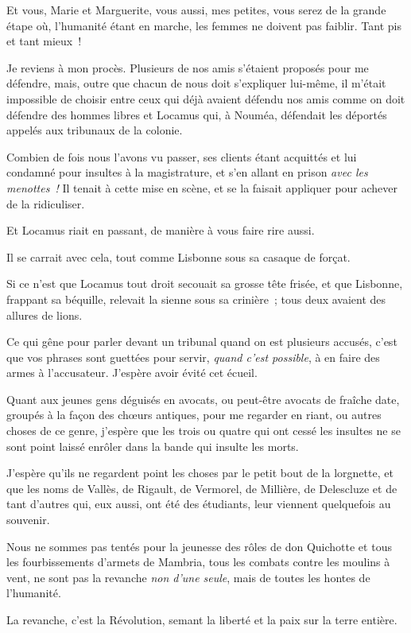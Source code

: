 \documentclass[french,twoside]{book} %
\begin{document}
Et vous, Marie et Marguerite, vous aussi, mes petites, vous serez de la grande étape où, l’humanité étant en marche, les femmes ne doivent pas faiblir. Tant pis et tant mieux !\par
Je reviens à mon procès. Plusieurs de nos amis s’étaient proposés pour me défendre, mais, outre que chacun de nous doit s’expliquer lui-même, il m’était impossible de choisir entre ceux qui déjà avaient défendu nos amis comme on doit défendre des hommes libres et Locamus qui, à Nouméa, défendait les déportés appelés aux tribunaux de la colonie.\par
Combien de fois nous l’avons vu passer, ses clients étant acquittés et lui condamné pour insultes à la magistrature, et s’en allant en prison \emph{avec les menottes !} Il tenait à cette mise en scène, et se la faisait appliquer pour achever de la ridiculiser.\par
Et Locamus riait en passant, de manière à vous faire rire aussi.\par
Il se carrait avec cela, tout comme Lisbonne sous sa casaque de forçat.\par
Si ce n’est que Locamus tout droit secouait sa  grosse tête frisée, et que Lisbonne, frappant sa béquille, relevait la sienne sous sa crinière ; tous deux avaient des allures de lions.\par
Ce qui gêne pour parler devant un tribunal quand on est plusieurs accusés, c’est que vos phrases sont guettées pour servir, \emph{quand c’est possible}, à en faire des armes à l’accusateur. J’espère avoir évité cet écueil.\par
Quant aux jeunes gens déguisés en avocats, ou peut-être avocats de fraîche date, groupés à la façon des chœurs antiques, pour me regarder en riant, ou autres choses de ce genre, j’espère que les trois ou quatre qui ont cessé les insultes ne se sont point laissé enrôler dans la bande qui insulte les morts.\par
J’espère qu’ils ne regardent point les choses par le petit bout de la lorgnette, et que les noms de Vallès, de Rigault, de Vermorel, de Millière, de Delescluze et de tant d’autres qui, eux aussi, ont été des étudiants, leur viennent quelquefois au souvenir.\par
Nous ne sommes pas tentés pour la jeunesse des rôles de don Quichotte et tous les fourbissements d’armets de Mambria, tous les combats contre les moulins à vent, ne sont pas la revanche \emph{non d’une seule}, mais de toutes les hontes de l’humanité.\par
 La revanche, c’est la Révolution, semant la liberté et la paix sur la terre entière.\par
\end{document}
